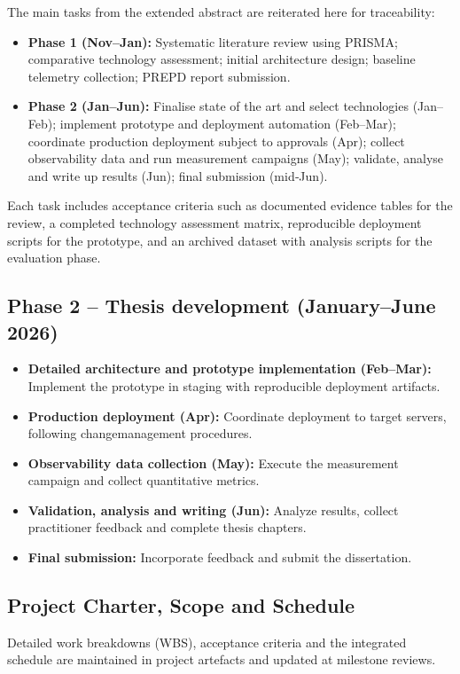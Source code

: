 The main tasks from the extended abstract are reiterated here for traceability:
\begin{itemize}
    \item \textbf{Phase 1 (Nov–Jan):} Systematic literature review using PRISMA; comparative technology assessment; initial architecture design; baseline telemetry collection; PREPD report submission.
    \item \textbf{Phase 2 (Jan–Jun):} Finalise state of the art and select technologies (Jan–Feb); implement prototype and deployment automation (Feb–Mar); coordinate production deployment subject to approvals (Apr); collect observability data and run measurement campaigns (May); validate, analyse and write up results (Jun); final submission (mid‑Jun).
\end{itemize}

Each task includes acceptance criteria such as documented evidence tables for the review, a completed technology assessment matrix, reproducible deployment scripts for the prototype, and an archived dataset with analysis scripts for the evaluation phase.

\subsection{Phase 2 -- Thesis development (January–June 2026)}
\begin{itemize}
    \item \textbf{Detailed architecture and prototype implementation (Feb–Mar):} Implement the prototype in staging with reproducible deployment artifacts.
    \item \textbf{Production deployment (Apr):} Coordinate deployment to target servers, following change\-management procedures.
    \item \textbf{Observability data collection (May):} Execute the measurement campaign and collect quantitative metrics.
    \item \textbf{Validation, analysis and writing (Jun):} Analyze results, collect practitioner feedback and complete thesis chapters.
    \item \textbf{Final submission:} Incorporate feedback and submit the dissertation.
\end{itemize}

\subsection{Project Charter, Scope and Schedule}
Detailed work breakdowns (WBS), acceptance criteria and the integrated schedule are maintained in project artefacts and updated at milestone reviews.

